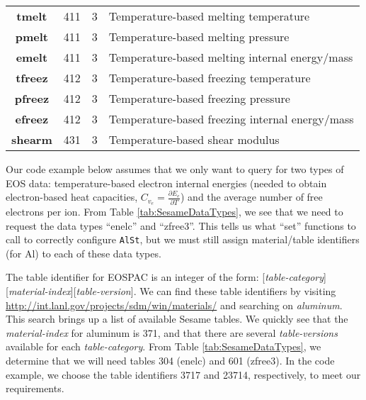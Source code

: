 \documentclass[11pt]{nmemo}
\begin{document}
\begin{table}[!ht]
\begin{center}
\begin{tabularx}{0.9\linewidth}{CDDL}
            \textbf{tmelt} & 411 & 3 & Temperature-based melting temperature\\
            \textbf{pmelt} & 411 & 3 & Temperature-based melting pressure\\
            \textbf{emelt} & 411 & 3 & Temperature-based melting internal energy/mass\\


            \textbf{tfreez} & 412 & 3 & Temperature-based freezing temperature\\
            \textbf{pfreez} & 412 & 3 & Temperature-based freezing pressure\\
            \textbf{efreez} & 412 & 3 & Temperature-based freezing internal energy/mass\\


            \textbf{shearm} & 431 & 3 & Temperature-based shear modulus\\

    \end{tabularx}
  \end{center}
  \normalsize
\end{table}

Our code example below assumes that we only want to query for two
types of EOS data: temperature-based electron internal energies
(needed to obtain electron-based heat capacities, $C_{v_e} =
\frac{\partial E_e} {\partial T}$) and the average number of free
electrons per ion.  From Table \ref{tab:SesameDataTypes}, we see that
we need to request the data types ``enelc'' and ``zfree3''.  This
tells us what ``set'' functions to call to correctly configure
\texttt{AlSt}, but we must still assign material/table identifiers
(for Al) to each of these data types.

The table identifier for EOSPAC is an integer of the form:
[\emph{table-category}][\emph{material-index}][\emph{table-version}].
We can find these table identifiers by visiting
\url{http://int.lanl.gov/projects/sdm/win/materials/} and searching on
\emph{aluminum}.  This search brings up a list of available Sesame
tables.  We quickly see that the \emph{material-index} for aluminum is
371, and that there are several \emph{table-versions} available for
each \emph{table-category}. From Table \ref{tab:SesameDataTypes}, we
determine that we will need tables 304 (enelc) and 601 (zfree3).  In
the code example, we choose the table identifiers 3717 and 23714,
respectively, to meet our requirements.
\end{document}
